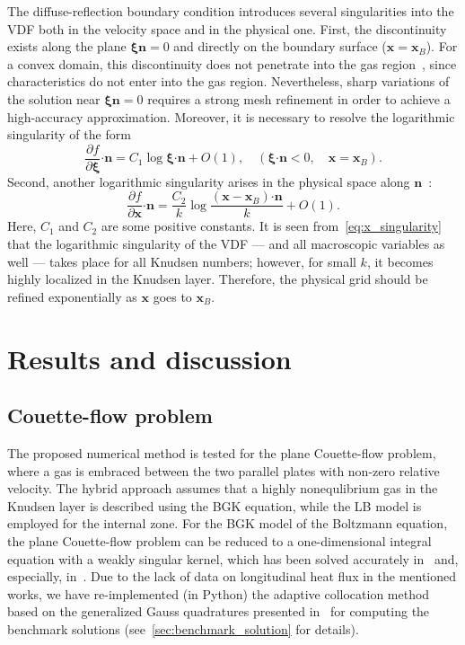 \documentclass{elsarticle} %
\newcommand{\pder}[2][]{\frac{\partial#1}{\partial#2}}
\newcommand{\OO}[1]{O(#1)}
\newcommand{\bxi}{\boldsymbol{\xi}}
\newcommand{\bn}{\boldsymbol{n}}
\newcommand{\bdot}{\boldsymbol{\cdot}}
\newcommand{\bx}{\boldsymbol{x}}
\begin{document}
The diffuse-reflection boundary condition introduces several singularities into the VDF
both in the velocity space and in the physical one.
First, the discontinuity exists along the plane \(\bxi\bn=0\) and directly on the boundary surface (\(\bx=\bx_B\)).
For a convex domain, this discontinuity does not penetrate into the gas region~\cite{Kim2011, Guo2017},
since characteristics do not enter into the gas region.
Nevertheless, sharp variations of the solution near \(\bxi\bn=0\) requires a strong mesh refinement
in order to achieve a high-accuracy approximation.
Moreover, it is necessary to resolve the logarithmic singularity of the form~\cite{Takata2016}
\begin{equation}\label{eq:xi_singularity}
    \pder[f]{\bxi}\bdot\bn = C_1\log\bxi\bdot\bn + \OO{1}, \quad (\bxi\bdot\bn<0, \quad \bx=\bx_B).
\end{equation}
Second, another logarithmic singularity arises in the physical space along \(\bn\)~\cite{Takata2014}:
\begin{equation}\label{eq:x_singularity}
    \pder[f]{\bx}\bdot\bn = \frac{C_2}{k}\log\frac{(\bx-\bx_B)\bdot\bn}{k} + \OO{1}.
\end{equation}
Here, \(C_1\) and \(C_2\) are some positive constants.
It is seen from~\eqref{eq:x_singularity} that the logarithmic singularity of the VDF
--- and all macroscopic variables as well --- takes place for all Knudsen numbers;
however, for small \(k\), it becomes highly localized in the Knudsen layer.
Therefore, the physical grid should be refined exponentially as \(\bx\) goes to \(\bx_B\).

\section{Results and discussion}\label{sec:results}

\subsection{Couette-flow problem}

The proposed numerical method is tested for the plane Couette-flow problem,
where a gas is embraced between the two parallel plates with non-zero relative velocity.
The hybrid approach assumes that a highly nonequlibrium gas in the Knudsen layer
is described using the BGK equation, while the LB model is employed for the internal zone.
For the BGK model of the Boltzmann equation, the plane Couette-flow problem can be reduced
to a one-dimensional integral equation with a weakly singular kernel,
which has been solved accurately in~\cite{Luo2015} and, especially, in~\cite{Luo2016}.
Due to the lack of data on longitudinal heat flux in the mentioned works, we have re-implemented (in Python)
the adaptive collocation method based on the generalized Gauss quadratures presented in~\cite{Luo2016}
for computing the benchmark solutions (see~\ref{sec:benchmark_solution} for details).
\end{document}

